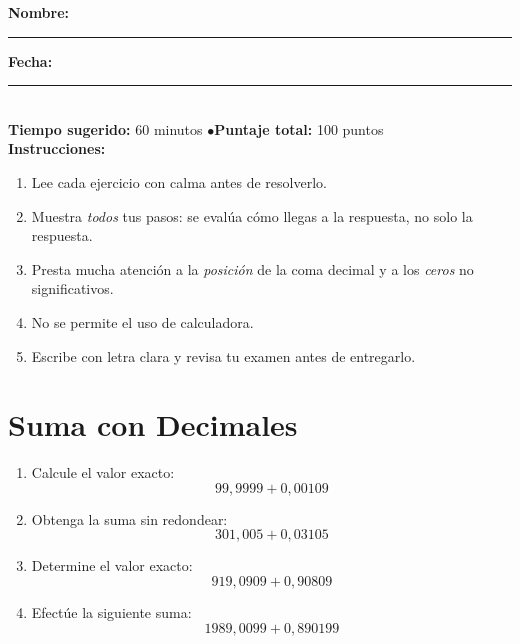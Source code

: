 \documentclass[12pt, letterpaper]{article}
\begin{document}


\vspace{4pt}
\begin{cuadroinfo}
  \small
  \textbf{Nombre:} \rule{0.55\linewidth}{0.4pt} \quad \textbf{Fecha:} \rule{0.15\linewidth}{0.4pt} \\[6pt]
  \textbf{Tiempo sugerido:} 60 minutos \quad$\bullet$\quad \textbf{Puntaje total:} 100 puntos \\[4pt]
  \textbf{Instrucciones:}
  \begin{enumerate}[leftmargin=*]
    \item Lee cada ejercicio con calma antes de resolverlo.
    \item Muestra \emph{todos} tus pasos: se evalúa cómo llegas a la respuesta, no solo la respuesta.
    \item Presta mucha atención a la \emph{posición} de la coma decimal y a los \emph{ceros} no significativos.
    \item No se permite el uso de calculadora.
    \item Escribe con letra clara y revisa tu examen antes de entregarlo.
  \end{enumerate}
\end{cuadroinfo}

\vspace{8pt}

\section{Suma con Decimales}

\begin{enumerate}[leftmargin=*]
  \item Calcule el valor exacto:
        \[
          99{,}9999 + 0{,}00109
        \]

  \item Obtenga la suma sin redondear:
        \[
          301{,}005 + 0{,}03105
        \]

  \item Determine el valor exacto:
        \[
          919{,}0909 + 0{,}90809
        \]

  \item Efectúe la siguiente suma:
        \[
          1989{,}0099 + 0{,}890199
        \]
\end{enumerate}
\end{document}
